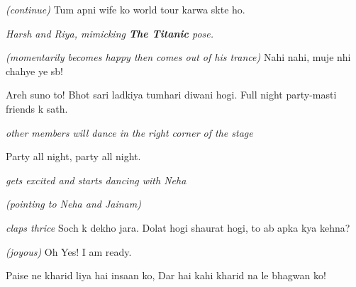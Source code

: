 \documentclass[12pt,a4paper,oneside]{memoir}
\begin{document}
\begin{description}[itemsep=1ex,leftmargin=1cm]
\item[BHARGAV] \textit{(continue)} Tum apni wife ko world tour karwa skte ho.

\textit{Harsh and Riya, mimicking \textbf{The Titanic} pose. }

\item[JAINAM] \textit{(momentarily becomes happy then comes out of his trance)} Nahi nahi, muje nhi chahye ye sb!

\item[BHARGAV] Areh suno to! Bhot sari ladkiya tumhari diwani hogi. Full night party-masti friends k sath.

\textit{other members will dance in the right corner of the stage}

\item[OTHERS] Party all night, party all night.

\item[JAINAM] \textit{gets excited and starts dancing with Neha}

\item[OTHERS] \textit{(pointing to Neha and Jainam)}

\item[BHARGAV] \textit{claps thrice} Soch k dekho jara. Dolat hogi shaurat hogi, to ab apka kya kehna?

\item[JAINAM] \textit{(joyous)} Oh Yes! I am ready.

\item[NEHA] Paise ne kharid liya hai insaan ko, Dar hai kahi kharid na le bhagwan ko!

\end{description}
\end{document}
